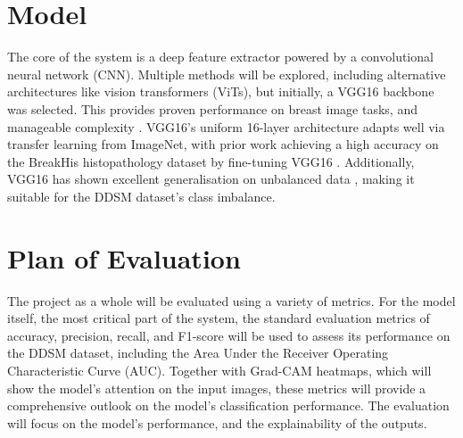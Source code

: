 \documentclass[../main]{subfiles}
\begin{document}
\section{Model}
The core of the system is a deep feature extractor powered by a convolutional neural network (CNN). Multiple methods will be explored, including alternative architectures like vision transformers (ViTs), but initially, a VGG16 backbone was selected. This provides proven performance on breast image tasks, and manageable complexity \autocite{fatima2025application}. VGG16's uniform 16-layer architecture adapts well via transfer learning from ImageNet, with prior work achieving a high accuracy on the BreakHis histopathology dataset by fine-tuning VGG16 \autocite{fatima2025application}. Additionally, VGG16 has shown excellent generalisation on unbalanced data \autocite{fatima2025application}, making it suitable for the DDSM dataset's class imbalance.

\section{Plan of Evaluation}
The project as a whole will be evaluated using a variety of metrics. For the model itself, the most critical part of the system, the standard evaluation metrics of accuracy, precision, recall, and F1-score will be used to assess its performance on the DDSM dataset, including the Area Under the Receiver Operating Characteristic Curve (AUC). Together with Grad-CAM heatmaps, which will show the model's attention on the input images, these metrics will provide a comprehensive outlook on the model's classification performance. The evaluation will focus on the model's performance, and the explainability of the outputs.
\end{document}
